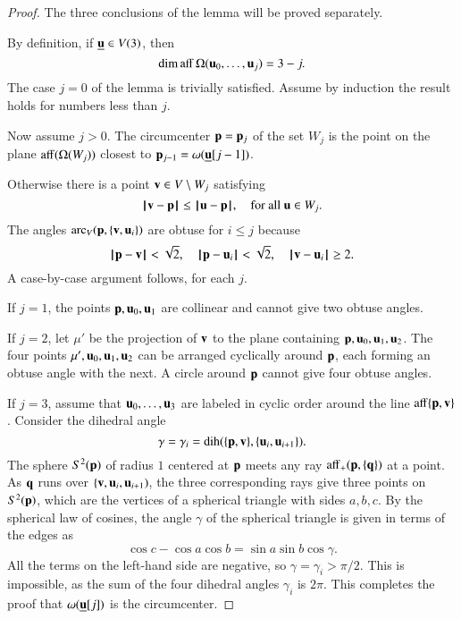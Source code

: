 \begin{proof} The three conclusions of the lemma will be proved separately.

%
 By definition, if ${\underline{{\mathbf u}}}\in V(3)$, then
\begin{displaymath}\operatorname{dim\,aff}\Omega( {\mathbf u}_0,\ldots, {\mathbf u}_j) = 3-j.\end{displaymath}  The case $j=0$ of the lemma is trivially
satisfied.  Assume by induction the result holds for numbers less than $j$.

Now assume $j>0$.
The circumcenter ${\mathbf p}={\mathbf p}_{j}$ of the set $W_{j}$ is the point on the plane ${\operatorname{aff}}(\Omega(W_{j}))$
closest to ${\mathbf p}_{j-1}=\omega({\underline{{\mathbf u}}}[j-1])$.  

   Otherwise
there is a point ${\mathbf v}\in V\setminus W_j$ satisfying
\begin{equation}\label{eqn:closest}
{\hskip0.1em|\hskip-0.15em|\hskip0.1em}{\mathbf v} - {\mathbf p}{\hskip0.1em|\hskip-0.15em|\hskip0.1em}\le {\hskip0.1em|\hskip-0.15em|\hskip0.1em} {\mathbf u} - {\mathbf p}{\hskip0.1em|\hskip-0.15em|\hskip0.1em}, \quad\text{for all }  {\mathbf u}\in W_j.
\end{equation}
The angles $\operatorname{arc}_V({\mathbf p},\{{\mathbf v}, {\mathbf u}_i\})$ are obtuse for $i\le j$ because
\begin{displaymath}
{\hskip0.1em|\hskip-0.15em|\hskip0.1em}{\mathbf p} - {\mathbf v}{\hskip0.1em|\hskip-0.15em|\hskip0.1em} < \sqrt2,\quad {\hskip0.1em|\hskip-0.15em|\hskip0.1em}{\mathbf p} -  {\mathbf u}_i{\hskip0.1em|\hskip-0.15em|\hskip0.1em} <\sqrt2,\quad {\hskip0.1em|\hskip-0.15em|\hskip0.1em}{\mathbf v} -  {\mathbf u}_i{\hskip0.1em|\hskip-0.15em|\hskip0.1em} \ge 2.
\end{displaymath} 
A case-by-case argument follows, for each $j$.

If $j=1$, the points ${\mathbf p}, {\mathbf u}_0, {\mathbf u}_1$ are collinear and cannot give two obtuse angles.

If $j=2$, let $\mu'$ be the projection of ${\mathbf v}$ to the plane containing
${\mathbf p}, {\mathbf u}_0, {\mathbf u}_1, {\mathbf u}_2$. The four points $\mu', {\mathbf u}_0, {\mathbf u}_1, {\mathbf u}_2$ can be arranged
cyclically around ${\mathbf p}$, each forming an obtuse angle with the next.  A circle around ${\mathbf p}$
cannot give four obtuse angles.


If $j=3$, assume that $ {\mathbf u}_0,\ldots, {\mathbf u}_3$ are labeled in cyclic order around the line
${\operatorname{aff}}\{{\mathbf p},{\mathbf v}\}$.  Consider the dihedral angle 
  \begin{displaymath}
  \gamma=\gamma_i=\operatorname{dih}(\{{\mathbf p},{\mathbf v}\},\{ {\mathbf u}_i, {\mathbf u}_{i+1}\}).
  \end{displaymath}
The sphere $S^2({\mathbf p})$ of radius $1$ centered at ${\mathbf p}$ meets any ray
${\operatorname{aff}}_+({\mathbf p},\{{\mathbf q}\})$ at a point.   As ${\mathbf q}$ runs over $\{{\mathbf v}, {\mathbf u}_i, {\mathbf u}_{i+1})$,  the three corresponding rays give three points on $S^2({\mathbf p})$, which are the vertices of a spherical triangle with sides $a,b,c$.  By the spherical law of cosines, the angle $\gamma$ of the spherical triangle is given in terms of the edges as
\begin{displaymath}
  \cos c - \cos a \cos b = \sin a \sin b \cos \gamma.
\end{displaymath}
All the terms on the left-hand side are negative, so $\gamma =\gamma_i > \pi/2$.
This is impossible, as the sum of the four dihedral angles $\gamma_i$ is $2\pi$.
This completes the proof that $\omega({\underline{{\mathbf u}}}[j])$ is the circumcenter.


\end{proof}
